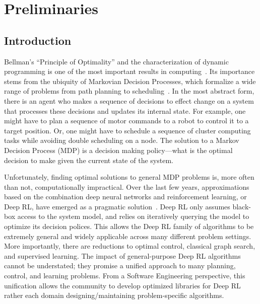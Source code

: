 \setcounter{secnumdepth}{0}
\chapter{Preliminaries}
\section{Introduction}
Bellman's ``Principle of Optimality'' and the characterization of dynamic programming is one of the most important results in computing~\cite{bellman2013dynamic}. Its importance stems from the ubiquity of Markovian Decision Processes, which formalize a wide range of problems from path planning to scheduling~\cite{howard1966dynamic}. In the most abstract form, there is an agent who makes a sequence of decisions to effect change on a system that processes these decisions and updates its internal state. For example, one might have to plan a sequence of motor commands to a robot to control it to a target position. Or, one might have to schedule a sequence of cluster computing tasks while avoiding double scheduling on a node. 
The solution to a Markov Decision Process (MDP) is a decision making policy---what is the optimal decision to make given the current state of the system. 



Unfortunately, finding optimal solutions to general MDP problems is, more often than not, computationally impractical. Over the last few years, approximations based on the combination deep neural networks and reinforcement learning, or Deep RL, have emerged as a pragmatic solution~\cite{mnih2015human,silver2017mastering}. Deep RL only assumes black-box access to the system model, and relies on iteratively querying the model to optimize its decision polices. This allows the Deep RL family of algorithms to be extremely general and widely applicable across many different problem settings. More importantly, there are reductions to optimal control, classical graph search, and supervised learning. The impact of general-purpose Deep RL algorithms cannot be understated; they promise a unified approach to many planning, control, and learning problems. 
From a Software Engineering perspective, this unification allows the community to develop optimized libraries for Deep RL rather each domain designing/maintaining problem-specific algorithms.

